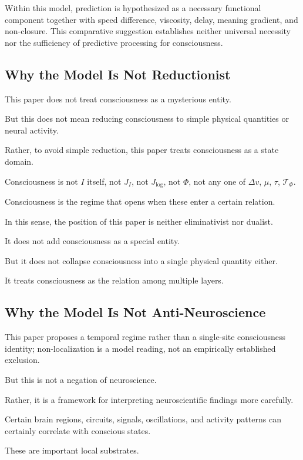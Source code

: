 Within this model, prediction is hypothesized as a necessary functional component together with speed difference, viscosity, delay, meaning gradient, and non-closure. This comparative suggestion establishes neither universal necessity nor the sufficiency of predictive processing for consciousness.

\subsection{Why the Model Is Not Reductionist}


This paper does not treat consciousness as a mysterious entity.

But this does not mean reducing consciousness to simple physical quantities or neural activity.

Rather, to avoid simple reduction, this paper treats consciousness as a state domain.

Consciousness is not $I$ itself, not $J_I$, not $J_{\log}$, not $\Phi$, not any one of $\Delta v$, $\mu$, $\tau$, $\mathcal{T}_{\Phi}$.

Consciousness is the regime that opens when these enter a certain relation.

In this sense, the position of this paper is neither eliminativist nor dualist.

It does not add consciousness as a special entity.

But it does not collapse consciousness into a single physical quantity either.

It treats consciousness as the relation among multiple layers.

\subsection{Why the Model Is Not Anti-Neuroscience}


This paper proposes a temporal regime rather than a single-site consciousness identity; non-localization is a model reading, not an empirically established exclusion.

But this is not a negation of neuroscience.

Rather, it is a framework for interpreting neuroscientific findings more carefully.

Certain brain regions, circuits, signals, oscillations, and activity patterns can certainly correlate with conscious states.

These are important local substrates.

